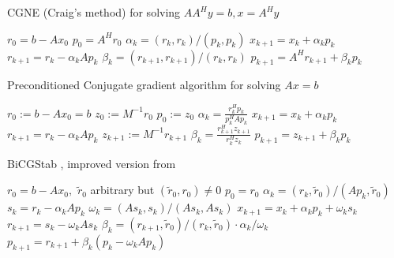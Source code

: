 \documentclass[10pt]{article}
\begin{document}
\begin{algorithm}[H]
  \caption{CGNE (Craig's method) for solving $AA^H y=b, x=A^H y$ \citep[algorithm 8.5]{Saad_2003_IMS}}
  \begin{algorithmic}[1]
    \State $r_0=b-Ax_0$
    \State $p_0 = A^H r_0$
    \State $\alpha_k = (r_k , r_k)/(p_k, p_k )$
    \State $x_{k+1} = x_k + \alpha_k  p_k$
    \State $r_{k+1} = r_k-\alpha_k Ap_k$
    \State $\beta_k = (r_{k+1},r_{k+1})/(r_k,r_k)$
    \State $p_{k+1}=A^H r_{k+1}+\beta_k p_k$
    \EndFor
  \end{algorithmic}
\end{algorithm}

\begin{algorithm}[H]
  \caption{Preconditioned Conjugate gradient algorithm for solving $Ax=b$ \citep[algorithm 9.1]{Saad_2003_IMS}}
  \begin{algorithmic}[1]
  \State $r_0:=b-A x_0=b$
  \State $z_0:=M^{-1}r_0$
  \State $p_0:=z_0$
    \State $\alpha_k=\frac{r_k^H p_k}{p_k^H Ap_k}$
    \State $x_{k+1}=x_k + \alpha_k p_k$
    \State $r_{k+1}=r_k - \alpha_k A p_k$
    \State $z_{k+1}:=M^{-1}r_{k+1}$
    \State $\beta_{k} = \frac{r_{k+1}^H z_{k+1}}{r_k^H z_k}$\;
    \State $p_{k+1}=z_{k+1} + \beta_k p_k$\;
    \EndFor
  \end{algorithmic}
\end{algorithm}


\begin{algorithm}[H]
  \caption{BiCGStab \citep{chen2016analysis}, improved version from \citep{van1992bicgstab}}\label{alg:CG}
  \begin{algorithmic}[1]
    \State $r_0=b-Ax_0,$ $\tilde{r}_0$ arbitrary but $(\tilde{r}_0,r_0)\neq 0$
    \State $p_0 = r_0$
    \State $\alpha_k = (r_k , \tilde{r}_0 )/(Ap_k , \tilde{r}_0 )$
    \State $s_k=r_k-\alpha_k Ap_k$ 
    \State $\omega_k = (As_k , s_k )/(As_k , As_k ) $
    \State $x_{k+1} = x_k + \alpha_k  p_k + \omega_k s_k$
    \State $r_{k+1}=s_k-\omega_k As_k$
    \State $\beta_k = (r_{k+1},\tilde{r}_0 )/(r_k,\tilde{r}_0 )\cdot \alpha_k/\omega_k$
    \State $p_{k+1}=r_{k+1}+\beta_k(p_k-\omega_k Ap_k)$
    \EndFor
  \end{algorithmic}
\end{algorithm}
\end{document}
